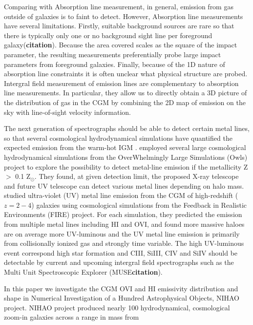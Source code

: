 \documentclass[useAMS,usenatbib]{mn2e}
\def \ion#1#2{#1{\footnotesize{#2}}\relax}
\def \hi       {\ion{H}{I}}
\def \ovi      {\ion{O}{VI}}
\begin{document}
Comparing with Absorption line measurement, in general, 
emission from gas outside of galaxies is to faint to detect.
However, Absorption line measurements have several limitations. 
Firstly, suitable background sources are rare so that there is 
typically only one or no background sight line per foreground
galaxy({\bf citation}). Because the area covered scales as the 
square of the impact parameter, the resulting measurements 
preferentially probe large impact parameters from foreground 
galaxies.
Finally, because of the 1D nature of absorption line constraints
it is often unclear what physical structure are probed.
Intergral field measurement of emission lines are complementary 
to absorption line measurements.
In particular, they allow us to directly obtain a 3D picture
of the distribution of gas in the CGM by combining the 2D map of
emission on the sky with line-of-sight velocity information.

The next generation of spectrographs should be able to detect certain metal
lines, so that several cosmological hydrodynamical simulations have quantified
the expected emission from the warm-hot IGM
\citep{Furlanetto04, Bertone10a, Bertone10b, Takei11, Bertone12,
Frank12, Rocarelli12}.
\citet{Voort13} employed several large cosmological hydrodynamical simulations
from the OverWhelmingly Large Simulations (Owls) project \citep{Schaye10}
to explore the possibility to 
detect metal-line emission if the metallicity Z $>$ 0.1 Z$_\odot$.
They found, at given detection limit, the proposed X-ray telescope and future UV
telescope can detect various metal lines depending on halo mass.
\citet{Sravan15} studied ultra-violet (UV) metal line emission from the CGM
of high-redshift ($z=2-4$) galaxies using cosmological simulations from the 
Feedback in Realistic Environments (FIRE) project.
For each simulation, they predicted the emission from multiple metal lines
including \hi{} and \ovi{}, and found more massive haloes are on average 
more UV-luminous and the UV metal line emission is primarily from collisionally
ionized gas and strongly time variable. The high UV-luminous event correspond
high star formation and \ion{C}{III}, \ion{Si}{III}, \ion{C}{IV} and \ion{Si}{IV}
should be detectable by current and upcoming intergral field spectrographs such
as the Multi Unit Spectroscopic Explorer (MUSE{\bf citation}).

In this paper we investigate the CGM \ovi{} and \hi{} emissivity distribution
and shape in Numerical Investigation of a Hundred Astrophysical Objects,
NIHAO \citep{Wang15} project.
NIHAO project produced nearly 100 hydrodynamical, cosmological zoom-in galaxies
across a range in mass from
\end{document}
